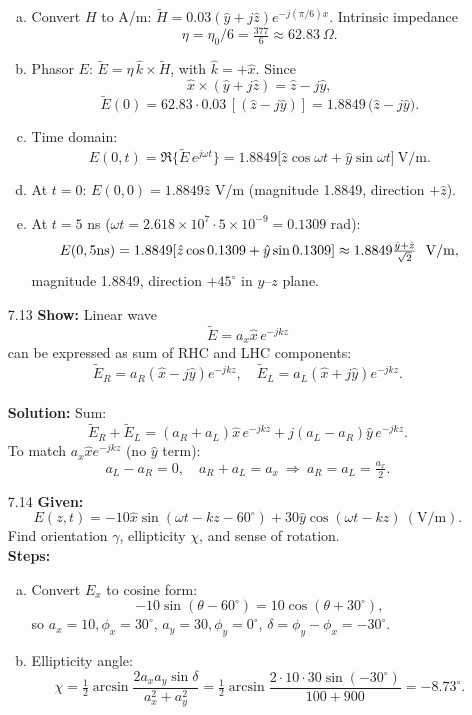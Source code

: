 \begin{enumerate}
\begin{enumerate}[(a)]
  \item Convert $H$ to A/m: $\tilde H=0.03(\hat y+j\hat z)e^{-j(\pi/6)x}$.  Intrinsic impedance
  \[\eta=\eta_0/6=\tfrac{377}{6}\approx62.83~\Omega.\]

  \item Phasor $E$: $\tilde E=\eta\,\hat k\times\tilde H$, with $\hat k=+\hat x$.  Since
  \[\hat x\times(\hat y+j\hat z)=\hat z - j\hat y,\]
  \[\tilde E(0)=62.83\cdot0.03\,[(\hat z - j\hat y)]
    =1.8849\,\bigl(\hat z - j\hat y\bigr).\]

  \item Time domain:
  \[E(0,t)=\Re\{\tilde E\,e^{j\omega t}\}
    =1.8849\bigl[\hat z\cos\omega t + \hat y\sin\omega t\bigr]~\mathrm{V/m}.\]

  \item At $t=0$: $E(0,0)=1.8849\hat z$ V/m (magnitude 1.8849, direction $+\hat z$).

  \item At $t=5$ ns ($\omega t=2.618\times10^7\cdot5\times10^{-9}=0.1309$ rad):
  \[E(0,5{\rm ns})=1.8849[\hat z\cos0.1309+\hat y\sin0.1309]
    \approx1.8849\tfrac{\hat y+\hat z}{\sqrt2}\ ~\mathrm{V/m},\]
  magnitude 1.8849, direction $+45^\circ$ in $y$–$z$ plane.
\end{enumerate}

\item[7.13] \textbf{Show:} Linear wave
\[\tilde E = a_x\hat x\,e^{-jkz}\]
can be expressed as sum of RHC and LHC components:
\[\tilde E_R=a_R(\hat x - j\hat y)e^{-jkz},\quad
  \tilde E_L=a_L(\hat x + j\hat y)e^{-jkz}.\]
\\
\textbf{Solution:} Sum:
\[\tilde E_R+\tilde E_L=(a_R+a_L)\hat x\,e^{-jkz}+j(a_L-a_R)\hat y\,e^{-jkz}.\]
To match $a_x\hat x e^{-jkz}$ (no $\hat y$ term):
\[a_L-a_R=0,\quad a_R+a_L=a_x\ \Longrightarrow\ a_R=a_L=\tfrac{a_x}{2}.\]

\item[7.14] \textbf{Given:}
\[E(z,t)=-10\hat x\sin(\omega t-kz-60^\circ)+30\hat y\cos(\omega t-kz)\ \mathrm{(V/m)}.\]
Find orientation $\gamma$, ellipticity $\chi$, and sense of rotation.
\\
\textbf{Steps:}
\begin{enumerate}[(a)]
  \item Convert $E_x$ to cosine form:
  \[-10\sin(\theta-60^\circ)=10\cos(\theta+30^\circ),\] so $a_x=10,\phi_x=30^\circ$, $a_y=30,\phi_y=0^\circ$, $\delta=\phi_y-\phi_x=-30^\circ$.

  \item Ellipticity angle:
  \[\chi=\tfrac12\arcsin\frac{2a_xa_y\sin\delta}{a_x^2+a_y^2}
    =\tfrac12\arcsin\frac{2\cdot10\cdot30\sin(-30^\circ)}{100+900}
    =-8.73^\circ.\]


\end{enumerate}
\end{enumerate}

